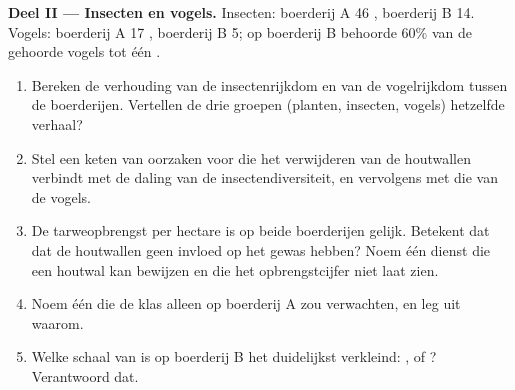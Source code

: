 \begin{problem}
\medskip
\noindent\textbf{Deel II --- Insecten en vogels.}
Insecten: boerderij A 46 , boerderij B 14. Vogels: boerderij A 17
, boerderij B 5; op boerderij B behoorde 60\% van de gehoorde
vogels tot één .
\begin{enumerate}[resume]
  \item Bereken de verhouding van de insectenrijkdom en van de
        vogelrijkdom tussen de boerderijen. Vertellen de drie groepen
        (planten, insecten, vogels) hetzelfde verhaal?
  \item Stel een keten van oorzaken voor die het verwijderen van de
        houtwallen verbindt met de daling van de insectendiversiteit, en
        vervolgens met die van de vogels.
  \item De tarweopbrengst per hectare is op beide boerderijen gelijk.
        Betekent dat dat de houtwallen geen invloed op het gewas hebben?
        Noem één dienst die een houtwal kan bewijzen en die het
        opbrengstcijfer niet laat zien.
  \item Noem één  die de klas alleen op boerderij A zou verwachten,
        en leg uit waarom.
  \item Welke schaal van  is op boerderij B het duidelijkst
        verkleind: ,  of ? Verantwoord dat.
\end{enumerate}


\end{problem}

